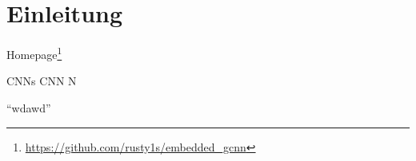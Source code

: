 \chapter{Einleitung}
\label{einleitung}

Homepage\footnote{\url{https://github.com/rusty1s/embedded\_gcnn}}

\glspl{CNN}
\gls{CNN}
\gls{N}

\enquote{wdawd}



